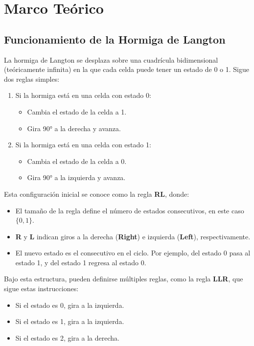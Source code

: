 \documentclass[12pt,twoside]{article}
\begin{document}
	\section{Marco Teórico}
	
	\subsection{Funcionamiento de la Hormiga de Langton}
	
	La hormiga de Langton se desplaza sobre una cuadrícula bidimensional (teóricamente infinita) en la que cada celda puede tener un estado de 0 o 1. Sigue dos reglas simples:  
	\begin{enumerate}
		\item Si la hormiga está en una celda con estado 0:
		\begin{itemize}
			\item Cambia el estado de la celda a 1.
			\item Gira 90° a la derecha y avanza.
		\end{itemize}
		\item Si la hormiga está en una celda con estado 1:
		\begin{itemize}
			\item Cambia el estado de la celda a 0.
			\item Gira 90° a la izquierda y avanza.
		\end{itemize}
	\end{enumerate}
	
	Esta configuración inicial se conoce como la regla \textbf{RL}, donde:  
	\begin{itemize}
		\item El tamaño de la regla define el número de estados consecutivos, en este caso $\{0, 1\}$.  
		\item \textbf{R} y \textbf{L} indican giros a la derecha (\textbf{Right}) e izquierda (\textbf{Left}), respectivamente.  
		\item El nuevo estado es el consecutivo en el ciclo. Por ejemplo, del estado 0 pasa al estado 1, y del estado 1 regresa al estado 0.  
	\end{itemize}
	
	Bajo esta estructura, pueden definirse múltiples reglas, como la regla \textbf{LLR}, que sigue estas instrucciones:  
	\begin{itemize}[noitemsep]
		\item Si el estado es 0, gira a la izquierda.  
		\item Si el estado es 1, gira a la izquierda.  
		\item Si el estado es 2, gira a la derecha.  
	\end{itemize}
	
\end{document}
